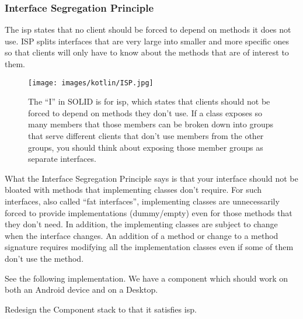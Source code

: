 \subsubsection{Interface Segregation Principle}
\label{sec:isp}

\begin{framed}
	The \gls{isp} states that no client should be forced to depend on methods it does not use.
	ISP splits interfaces that are very large into smaller and more specific ones so that clients will only have to know about the methods that are of interest to them.
\end{framed}

\begin{figure}
	\centering
	\texttt{[image: images/kotlin/ISP.jpg]}
	\caption{The “I” in SOLID is for \gls{isp}, which states that clients should not be forced to depend on methods they don’t use.
		If a class exposes so many members that those members can be broken down into groups that serve different clients that don’t use members from the other groups, you should think about exposing those member groups as separate interfaces.}
	\label{fir:lsp}
\end{figure}

What the Interface Segregation Principle says is that your interface should not be bloated with methods that implementing classes don’t require.
For such interfaces, also called “fat interfaces”, implementing classes are unnecessarily forced to provide implementations (dummy/empty) even for those methods that they don’t need.
In addition, the implementing classes are subject to change when the interface changes.
An addition of a method or change to a method signature requires modifying all the implementation classes even if some of them don’t use the method.

See the following implementation.
We have a component which should work on both an Android device and on a Desktop. 







\begin{exercise}
	Redesign the Component stack to that it satisfies \gls{isp}.
\end{exercise}


